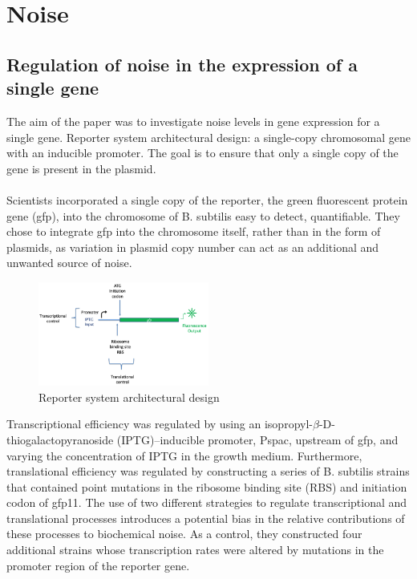 \graphicspath{{chapters/images/noise/}}
\chapter{Noise}
\section{Regulation of noise in the expression of a single gene}
The aim of the paper was to investigate noise levels in gene expression for a single gene.
Reporter system architectural design: a single-copy chromosomal gene with an inducible promoter. The goal is to ensure that only a single copy of the gene is present in the plasmid.
 \\
 \\
 \noindent
Scientists incorporated a single copy of the reporter, the green fluorescent protein gene (gfp), into the chromosome of B. subtilis easy to detect, quantifiable. They chose to integrate gfp into the chromosome itself, rather than in the form of plasmids, as variation in plasmid copy number can act as an additional and unwanted source of noise. 
\begin{figure}[h]
\includegraphics[width=0.5\textwidth]{design_gfp}
\caption{\label{fig:gfp} Reporter system architectural design}
\end{figure}
\noindent
Transcriptional efficiency was regulated by using an isopropyl-$\beta$-D- thiogalactopyranoside (IPTG)–inducible promoter, Pspac, upstream of gfp, and varying the concentration of IPTG in the growth medium. Furthermore, translational efficiency was regulated by constructing a series of B. subtilis strains that contained point mutations in the ribosome binding site (RBS) and initiation codon of gfp11. The use of two different strategies to regulate transcriptional and translational processes introduces a potential bias in the relative contributions of these processes to biochemical noise. 
As a control, they constructed four additional strains whose transcription rates were altered by mutations in the promoter region of the reporter gene. 
\\
